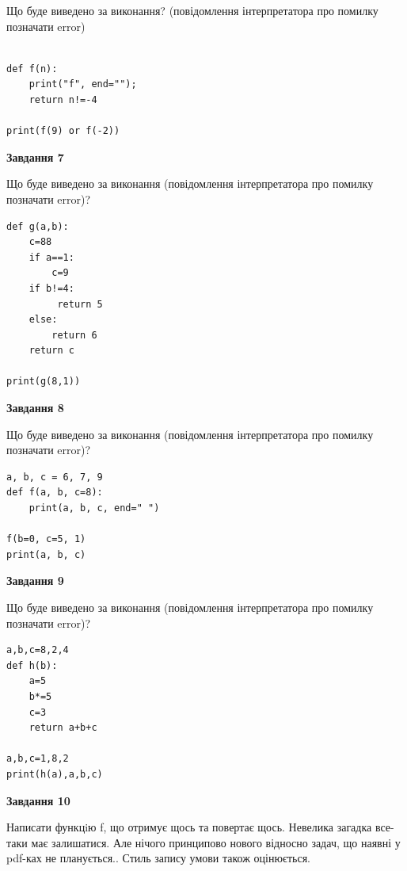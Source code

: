 \documentclass[12pt, ukrainian]{article}
\begin{document}
{\begin {large}
Що буде виведено за виконання? (повідомлення інтерпретатора про помилку позначати error)\par
\begin{verbatim}

def f(n):
    print("f", end="");
    return n!=-4

print(f(9) or f(-2))
\end{verbatim}

{\begin {center}\textbf{Завдання 7}\end {center}}

Що буде виведено за виконання (повідомлення інтерпретатора про помилку позначати error)?\par
\begin{verbatim}
def g(a,b):
    c=88
    if a==1:
        c=9
    if b!=4:
         return 5
    else: 
        return 6
    return c

print(g(8,1))
\end{verbatim}

{\begin {center}\textbf{Завдання 8}\end {center}}

Що буде виведено за виконання (повідомлення інтерпретатора про помилку позначати error)?\par
\begin{verbatim}
a, b, c = 6, 7, 9
def f(a, b, c=8):
    print(a, b, c, end=" ")

f(b=0, c=5, 1)
print(a, b, c)
\end{verbatim}

{\begin {center}\textbf{Завдання 9}\end {center}}

Що буде виведено за виконання (повідомлення інтерпретатора про помилку позначати error)?\par
\begin{verbatim}
a,b,c=8,2,4
def h(b):
    a=5
    b*=5
    c=3
    return a+b+c

a,b,c=1,8,2
print(h(a),a,b,c)
\end{verbatim}

{\begin {center}\textbf{Завдання 10}\end {center}}


Написати функцiю f, що отримує щось та повертає щось. Невелика загадка все-таки має залишатися. Але нічого принципово нового відносно задач, що наявні у pdf-ках не планується.. Стиль запису умови також оцінюється.\par
\end {large}}
\newpage
\end{document}
